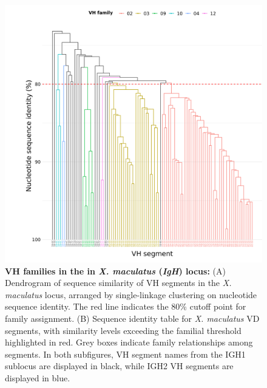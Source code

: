 			\begin{figure}
	\centering
	\includegraphics[width=\textwidth]{_Figures/png/xma-vh-families-tree} %
	\caption[VH families in the in \textit{X. maculatus} \textit{IgH} locus]{\textbf{VH families in the in \textit{X. maculatus} (\textit{IgH}) locus:} (A) Dendrogram of sequence similarity of VH segments in the \textit{X. maculatus} locus, arranged by single-linkage clustering on nucleotide sequence identity. The red line indicates the 80\% cutoff point for family assignment. (B) Sequence identity table for \textit{X. maculatus} VD segments, with similarity levels exceeding the familial threshold highlighted in red. Grey boxes indicate family relationships among segments. In both subfigures, VH segment names from the IGH1 sublocus are displayed in black, while IGH2 VH segments are displayed in blue.}
	\label{fig:xma-vh-families-tree}
	\end{figure}
	
